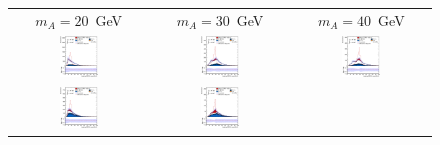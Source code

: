 \documentclass[preprintnumbers,superscriptaddress,nofootinbib,aps,prd,floatfix]{revtex4}
\begin{document}

\begin{figure}[htbp]
\begin{center}
\begin{tabular}{ccc}
$m_A = 20$~GeV & $m_A = 30$~GeV &  $m_A = 40$~GeV \\
\includegraphics[width=0.3\textwidth]{Figures/21stJuly/tta20/VD_1.eps} &
\includegraphics[width=0.3\textwidth]{Figures/21stJuly/tta30/VD_1.eps} &
\includegraphics[width=0.3\textwidth]{Figures/21stJuly/tta40/VD_1.eps} \\
\includegraphics[width=0.3\textwidth]{Figures/21stJuly/tta20/VD_2.eps} &
\includegraphics[width=0.3\textwidth]{Figures/21stJuly/tta30/VD_2.eps} &

\end{tabular}
\end{center}
\end{figure}
\end{document}
